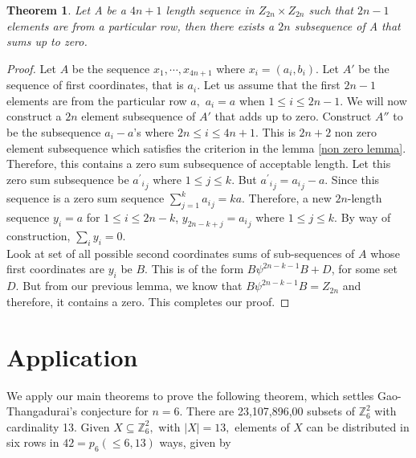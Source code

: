 \documentclass[reqno,10pt]{amsart}
\newtheorem{thm}[prop]{Theorem}
\begin{document}
\begin{thm}\label{Main Theorem 2}
 Let A be a $4n+1$ length sequence in $Z_{2n}\times Z_{2n}$ such that $2n-1$ elements are from a particular row, then there exists a $2n$ subsequence of A that sums up to zero.
 \end{thm}
\begin{proof}
 Let $A$ be the sequence $x_1, \cdots, x_{4n+1}$ where $x_i=(a_i,b_i)$. Let $A'$ be the sequence of first coordinates, that is $a_i$. Let us assume that the first $2n-1$ elements are from the particular row $a,$ $a_i=a$ when $1 \leq i \leq 2n-1$. We will now construct a $2n$ element subsequence of $A'$ that adds up to zero. Construct $A''$ to be the subsequence $a_i-a$'s where $2n \leq i \leq 4n+1$. This is $2n+2$ non zero element subsequence which satisfies the criterion in the lemma \ref{non zero lemma}. Therefore, this contains a zero sum subsequence of acceptable length. Let this zero sum subsequence be ${{{a^{'} }_i}_j}$ where $1\leq j \leq k$. But  ${{{a^{'} }_i}_j}={a_i}_j-a$. Since this sequence is a zero sum sequence $\sum_{j=1}^k {a_i}_j=ka$.
Therefore, a new $2n$-length sequence $y_i=a$ for $1\leq i \leq 2n-k$, $y_{2n-k+j}={a_i}_j$ where $1\leq j \leq k$. By way of construction, $\sum_i y_i=0 $.\\
Look at set of all possible second coordinates sums of sub-sequences of $A$ whose first coordinates are $y_i$ be $B$. 
This is of the form $ B \psi^{2n-k-1} B + D$, for some set $D.$ But from our previous lemma, we know that 
$B \psi^{2n-k-1} B = Z_{2n}$ and therefore, it contains a zero. This completes our proof.
\end{proof}

\section{Application}
We apply our main theorems to prove the following theorem, which settles Gao-Thangadurai's conjecture for
$n=6.$ There are 23,107,896,00 subsets of $\mathbb{Z}_{6}^2$ with cardinality 13. Given 
$X \subseteq \mathbb{Z}_{6}^2,$ with $|X|=13,$ elements of $X$ can be distributed in six rows
in $42 = p_6(\leq 6, 13)$ ways, given by
\end{document}
